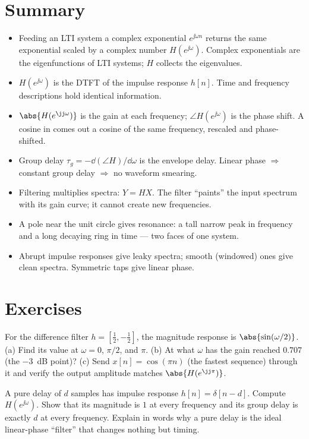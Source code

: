 \section{Summary}
\label{ch14:summary}

\begin{itemize}
  \item Feeding an LTI system a complex exponential $e^{\jj\omega n}$ returns the
  same exponential scaled by a complex number $H(e^{\jj\omega})$. Complex
  exponentials are the eigenfunctions of LTI systems; $H$ collects the
  eigenvalues.
  \item $H(e^{\jj\omega})$ is the DTFT of the impulse response $h[n]$. Time and
  frequency descriptions hold identical information.
  \item $\abs{H(e^{\jj\omega})}$ is the gain at each frequency;
  $\angle H(e^{\jj\omega})$ is the phase shift. A cosine in comes out a cosine
  of the same frequency, rescaled and phase-shifted.
  \item Group delay $\tau_g = -\dd(\angle H)/\dd\omega$ is the envelope delay.
  Linear phase $\Rightarrow$ constant group delay $\Rightarrow$ no waveform
  smearing.
  \item Filtering multiplies spectra: $Y = HX$. The filter ``paints'' the input
  spectrum with its gain curve; it cannot create new frequencies.
  \item A pole near the unit circle gives resonance: a tall narrow peak in
  frequency and a long decaying ring in time --- two faces of one system.
  \item Abrupt impulse responses give leaky spectra; smooth (windowed) ones give
  clean spectra. Symmetric taps give linear phase.
\end{itemize}

\section{Exercises}
\label{ch14:exercises}

\begin{exercise}
For the difference filter $h=[\tfrac12,-\tfrac12]$, the magnitude response is
$\abs{\sin(\omega/2)}$. (a) Find its value at $\omega=0$, $\pi/2$, and $\pi$.
(b) At what $\omega$ has the gain reached $0.707$ (the $-3$~dB point)?
(c) Send $x[n]=\cos(\pi n)$ (the fastest sequence) through it and verify the
output amplitude matches $\abs{H(e^{\jj\pi})}$.
\end{exercise}

\begin{exercise}
A pure delay of $d$ samples has impulse response $h[n]=\delta[n-d]$. Compute
$H(e^{\jj\omega})$. Show that its magnitude is $1$ at every frequency and its
group delay is exactly $d$ at every frequency. Explain in words why a pure delay
is the ideal linear-phase ``filter'' that changes nothing but timing.
\end{exercise}


